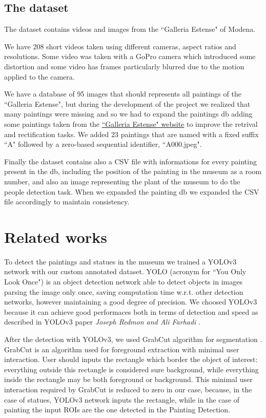 \documentclass[10pt,twocolumn,letterpaper]{article}
\begin{document}
\subsection{The dataset}

The dataset contains videos and images from the ``Galleria Estense" of Modena.

We have 208 short videos taken using different cameras, aspect ratios and resolutions. 
Some video was taken with a GoPro camera which introduced some distortion and
some video has frames particularly blurred due to the motion applied to the camera.

We have a database of 95 images that should represents all paintings of the ``Galleria Estense", 
but during the development of the project we realized that many paintings were missing 
and so we had to expand the paintings db adding some paintings taken from the \href{https://www.gallerie-estensi.beniculturali.it/opere/#c-dipinti#c-sculture#l-galleria-estense}{``Galleria Estense" website} to improve the retrival and rectification tasks. We added 23 paintings that are named 
with a fixed suffix ``A" followed by a zero-based sequential identifier, \eg ``A000.jpeg".

Finally the dataset contains also a CSV file with informations for every painting present
in the db, including the position of the painting in the museum as a room number, and also an image
representing the plant of the museum to do the people detection task. When we expanded the 
painting db we expanded the CSV file accordingly to maintain consistency.

\section{Related works}

To detect the paintings and statues in the museum we trained a YOLOv3 network with
our custom annotated dataset. YOLO (acronym for ``You Only Look Once") is an object detection
network able to detect objects in images parsing the image only once, saving computation time w.r.t. 
other detection networks, however maintaining a good degree of precision.
We choosed YOLOv3 because it can achieve good performaces
both in terms of detection and speed as described in YOLOv3 paper \textit{Joseph Redmon and Ali Farhadi} \cite{yolov3}.

After the detection with YOLOv3, we used GrabCut algorithm for segmentation \cite{grabcut}.
GrabCut is an algorithm used for foreground extraction with minimal user interaction.
User should inputs the rectangle which border the object of interest: everything outside this rectangle is considered sure background, while everything inside the rectangle may be both foreground or background.
This minimal user interaction required by GrabCut is reduced to zero in our case, because, in the case of statues, YOLOv3 network inputs the rectangle, while in the case of painting the input ROIs are the one detected in the Painting Detection.
\end{document}
